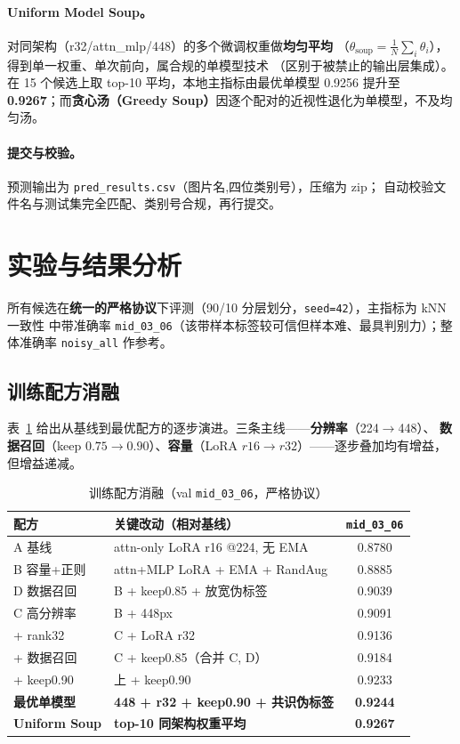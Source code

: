 \documentclass[11pt]{ctexart}
\newcommand{\kw}[1]{\textbf{#1}}
\begin{document}
\paragraph{Uniform Model Soup。}对同架构（r32/attn\_mlp/448）的多个微调权重做\kw{均匀平均}
（$\theta_{\text{soup}}=\frac1N\sum_i\theta_i$），得到单一权重、单次前向，属合规的单模型技术
（区别于被禁止的输出层集成）。在 15 个候选上取 top-10 平均，本地主指标由最优单模型 0.9256
提升至 \kw{0.9267}；而\kw{贪心汤（Greedy Soup）}因逐个配对的近视性退化为单模型，不及均匀汤。

\paragraph{提交与校验。}预测输出为 \texttt{pred\_results.csv}（图片名,四位类别号），压缩为 zip；
自动校验文件名与测试集完全匹配、类别号合规，再行提交。

\section{实验与结果分析}
所有候选在\kw{统一的严格协议}下评测（90/10 分层划分，\texttt{seed=42}），主指标为 kNN 一致性
中带准确率 \texttt{mid\_03\_06}（该带样本标签较可信但样本难、最具判别力）；整体准确率
\texttt{noisy\_all} 作参考。

\subsection{训练配方消融}
表~\ref{tab:abl} 给出从基线到最优配方的逐步演进。三条主线——\kw{分辨率}（224$\to$448）、
\kw{数据召回}（keep $0.75\to0.90$）、\kw{容量}（LoRA $r16\to r32$）——逐步叠加均有增益，
但增益递减。
\begin{table}[h]\centering\small
\caption{训练配方消融（val \texttt{mid\_03\_06}，严格协议）}\label{tab:abl}
\begin{tabular}{@{}llc@{}}
\toprule
配方 & 关键改动（相对基线） & \texttt{mid\_03\_06} \\
\midrule
A 基线              & attn-only LoRA r16 @224, 无 EMA        & 0.8780 \\
B 容量+正则         & attn+MLP LoRA + EMA + RandAug          & 0.8885 \\
D 数据召回          & B + keep0.85 + 放宽伪标签              & 0.9039 \\
C 高分辨率          & B + 448px                             & 0.9091 \\
\quad + rank32      & C + LoRA r32                          & 0.9136 \\
\quad + 数据召回    & C + keep0.85（合并 C, D）             & 0.9184 \\
\quad + keep0.90    & 上 + keep0.90                         & 0.9233 \\
\textbf{最优单模型} & \textbf{448 + r32 + keep0.90 + 共识伪标签} & \textbf{0.9244} \\
\midrule
\textbf{Uniform Soup} & \textbf{top-10 同架构权重平均}        & \textbf{0.9267} \\
\bottomrule
\end{tabular}
\end{table}
\end{document}
